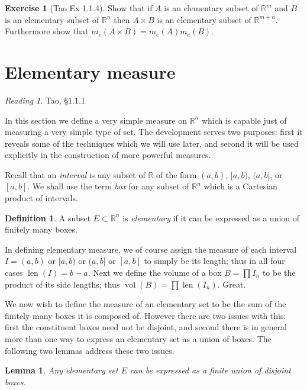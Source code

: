 \documentclass[11pt,oneside]{amsbook}
\newcommand{\RR}{{\mathbb R}}
\DeclareMathOperator{\len}{len}
\DeclareMathOperator{\vol}{vol}
\theoremstyle{definition}
\newtheorem{exerc}{Exercise}[section]
\theoremstyle{plain}
\newtheorem{lem}[thm]{Lemma}
\theoremstyle{definition}
\newtheorem{defn}[thm]{Definition}
\theoremstyle{remark}
\newtheorem*{reading}{Reading}
\numberwithin{equation}{section}
\numberwithin{figure}{section}
\begin{document}
\begin{exerc}[Tao Ex 1.1.4]
  Show that if $A$ is an elementary subset of $\RR^m$ and $B$ is an elementary subset of $\RR^n$ then $A\times B$ is an elementary subset of $\RR^{m+n}$. Furthermore show that $m_e(A\times B)=m_e(A)m_e(B)$.
\end{exerc}

\newpage
\section{Elementary measure}

\begin{reading}
  Tao, \S1.1.1
\end{reading}

In this section we define a very simple measure on $\RR^n$ which is capable just of measuring a very simple type of set. The development serves two purposes: first it reveals some of the techniques which we will use later, and second it will be used explicitly in the construction of more powerful measures.

Recall that an \emph{interval} is any subset of $\RR$ of the form $(a,b)$, $[a,b)$, $(a,b]$, or $[a,b]$. We shall use the term \emph{box} for any subset of $\RR^n$ which is a Cartesian product of intervals.

\begin{defn}
  A subset $E\subset\RR^n$ is \emph{elementary} if it can be expressed as a union of finitely many boxes.
\end{defn}

In defining elementary measure, we of course assign the measure of each interval $I=(a,b)$ or $[a,b)$ or $(a,b]$ or $[a,b]$ to simply be its length; thus in all four cases $\len(I)=b-a$. Next we define the volume of a box $B=\prod I_n$ to be the product of its side lengths; thus $\vol(B)=\prod\len(I_n)$. Great.

We now wish to define the measure of an elementary set to be the sum of the finitely many boxes it is composed of. However there are two issues with this: first the constituent boxes need not be disjoint, and second there is in general more than one way to express an elementary set as a union of boxes. The following two lemmas address these two issues.

\begin{lem}
  Any elementary set $E$ can be expressed as a finite union of disjoint boxes.
\end{lem}
\end{document}
